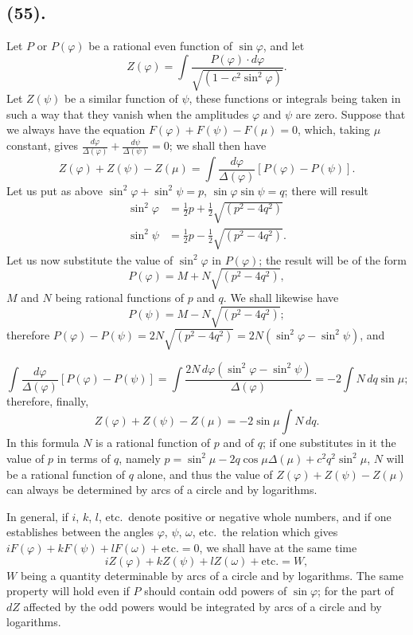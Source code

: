 \documentclass{article}
\begin{document}
\subsection*{(55).}

Let $P$ or $P(\varphi)$ be a rational even function of $\sin\varphi$, and let
\[ Z(\varphi)=\int\frac{P(\varphi)\cdot d\varphi}{\sqrt{(1-c^{2}\sin^{2}\varphi)}}. \]
Let $Z(\psi)$ be a similar function of $\psi$, these functions or integrals being taken in such a way that they vanish when the amplitudes $\varphi$ and $\psi$ are zero. Suppose that we always have the equation $F(\varphi)+F(\psi)-F(\mu)=0$, which, taking $\mu$ constant, gives $\frac{d\varphi}{\Delta(\varphi)}+\frac{d\psi}{\Delta(\psi)}=0$; we shall then have
\[ Z(\varphi)+Z(\psi)-Z(\mu)=\int\frac{d\varphi}{\Delta(\varphi)}[P(\varphi)-P(\psi)]. \]
Let us put as above $\sin^{2}\varphi+\sin^{2}\psi=p$, $\sin\varphi\sin\psi=q$; there will result
\[ \begin{aligned} \sin^{2}\varphi&=\tfrac{1}{2}p+\tfrac{1}{2}\sqrt{(p^{2}-4q^{2})}\\ \sin^{2}\psi&=\tfrac{1}{2}p-\tfrac{1}{2}\sqrt{(p^{2}-4q^{2})}. \end{aligned} \]
Let us now substitute the value of $\sin^{2}\varphi$ in $P(\varphi)$; the result will be of the form
\[ P(\varphi)=M+N\sqrt{(p^{2}-4q^{2})}, \]
$M$ and $N$ being rational functions of $p$ and $q$. We shall likewise have
\[ P(\psi)=M-N\sqrt{(p^{2}-4q^{2})}; \]
therefore $P(\varphi)-P(\psi)=2N\sqrt{(p^{2}-4q^{2})}=2N(\sin^{2}\varphi-\sin^{2}\psi)$, and

\[ \int\frac{d\varphi}{\Delta(\varphi)}[P(\varphi)-P(\psi)]=\int\frac{2N\,d\varphi(\sin^{2}\varphi-\sin^{2}\psi)}{\Delta(\varphi)}=-2\int N\,dq\sin\mu; \]
therefore, finally,
\[ Z(\varphi)+Z(\psi)-Z(\mu)=-2\sin\mu\int N\,dq. \]
In this formula $N$ is a rational function of $p$ and of $q$; if one substitutes in it the value of $p$ in terms of $q$, namely $p=\sin^{2}\mu-2q\cos\mu\Delta(\mu)+c^{2}q^{2}\sin^{2}\mu$, $N$ will be a rational function of $q$ alone, and thus the value of $Z(\varphi)+Z(\psi)-Z(\mu)$ can always be determined by arcs of a circle and by logarithms.

In general, if $i$, $k$, $l$, etc.\ denote positive or negative whole numbers, and if one establishes between the angles $\varphi$, $\psi$, $\omega$, etc.\ the relation which gives $iF(\varphi)+kF(\psi)+lF(\omega)+\text{etc.}=0$, we shall have at the same time
\[ iZ(\varphi)+kZ(\psi)+lZ(\omega)+\text{etc.}=W, \]
$W$ being a quantity determinable by arcs of a circle and by logarithms. The same property will hold even if $P$ should contain odd powers of $\sin\varphi$; for the part of $dZ$ affected by the odd powers would be integrated by arcs of a circle and by logarithms.
\end{document}
